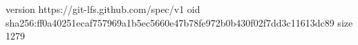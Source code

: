 version https://git-lfs.github.com/spec/v1
oid sha256:ff0a40251ecaf757969a1b5ec5660e47b78fe972b0b430f02f7dd3c11613dc89
size 1279

